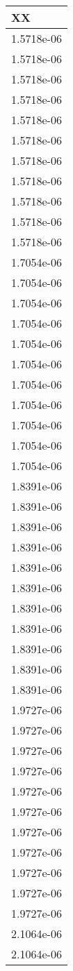 \begin{tabular}{l}
XX \\ 
\hline 
1.5718e-06 \\ 
1.5718e-06 \\ 
1.5718e-06 \\ 
1.5718e-06 \\ 
1.5718e-06 \\ 
1.5718e-06 \\ 
1.5718e-06 \\ 
1.5718e-06 \\ 
1.5718e-06 \\ 
1.5718e-06 \\ 
1.5718e-06 \\ 
1.7054e-06 \\ 
1.7054e-06 \\ 
1.7054e-06 \\ 
1.7054e-06 \\ 
1.7054e-06 \\ 
1.7054e-06 \\ 
1.7054e-06 \\ 
1.7054e-06 \\ 
1.7054e-06 \\ 
1.7054e-06 \\ 
1.7054e-06 \\ 
1.8391e-06 \\ 
1.8391e-06 \\ 
1.8391e-06 \\ 
1.8391e-06 \\ 
1.8391e-06 \\ 
1.8391e-06 \\ 
1.8391e-06 \\ 
1.8391e-06 \\ 
1.8391e-06 \\ 
1.8391e-06 \\ 
1.8391e-06 \\ 
1.9727e-06 \\ 
1.9727e-06 \\ 
1.9727e-06 \\ 
1.9727e-06 \\ 
1.9727e-06 \\ 
1.9727e-06 \\ 
1.9727e-06 \\ 
1.9727e-06 \\ 
1.9727e-06 \\ 
1.9727e-06 \\ 
1.9727e-06 \\ 
2.1064e-06 \\ 
2.1064e-06 \\ 

\end{tabular}
